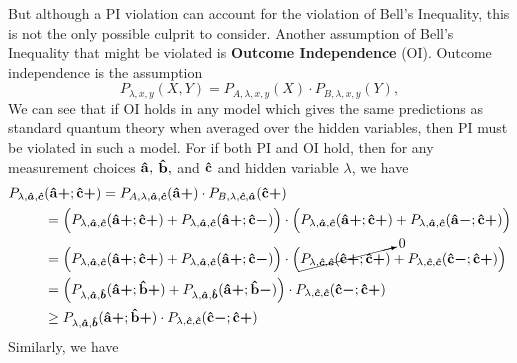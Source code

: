But although a PI violation can account for the violation of Bell's Inequality, this is not the only possible culprit to consider. Another assumption of Bell's Inequality that might be violated is \textbf{Outcome Independence} (OI). Outcome independence is the assumption
\begin{equation}\label{OI}
P_{\lambda,x,y}(X,Y)=P_{A,\lambda,x,y}(X)\cdot P_{B,\lambda,x,y}(Y),
\end{equation}
We can see that if OI holds in any model which gives the same predictions as standard quantum theory when averaged over the hidden variables, then PI must be violated in such a model. For if both PI and OI hold, then for any measurement choices $\vb{\hat{a}},$ $\vb{\hat{b}},$ and $\vb{\hat{c}}$ and hidden variable $\lambda$, we have
\begin{equation}\label{OIPI1}
\begin{split}
 P_{\lambda,\bm{\hat{a}},\bm{\hat{c}}}&(\vb{\hat{{a}}}\bm{+};\vb{\hat{{c}}}\bm{+})=P_{A,\lambda,\bm{\hat{a}},\bm{\hat{c}}}(\vb{\hat{{a}}}\bm{+})\cdot P_{B,\lambda,\bm{\hat{c}},\bm{\hat{a}}}(\vb{\hat{{c}}}\bm{+})\\
 &= \Big( P_{\lambda,\bm{\hat{a}},\bm{\hat{c}}}(\vb{\hat{{a}}}\bm{+};\vb{\hat{{c}}}\bm{+})+ P_{\lambda,\bm{\hat{a}},\bm{\hat{c}}}(\vb{\hat{{a}}}\bm{+};\vb{\hat{{c}}}\bm{-})\Big)\cdot\Big( P_{\lambda,\bm{\hat{a}},\bm{\hat{c}}}(\vb{\hat{{a}}}\bm{+};\vb{\hat{{c}}}\bm{+})+ P_{\lambda,\bm{\hat{a}},\bm{\hat{c}}}(\vb{\hat{{a}}}\bm{-};\vb{\hat{{c}}}\bm{+})\Big)\\
 &= \Big( P_{\lambda,\bm{\hat{a}},\bm{\hat{c}}}(\vb{\hat{{a}}}\bm{+};\vb{\hat{{c}}}\bm{+})+ P_{\lambda,\bm{\hat{a}},\bm{\hat{c}}}(\vb{\hat{{a}}}\bm{+};\vb{\hat{{c}}}\bm{-})\Big)\cdot\Big( \cancelto{0}{P_{\lambda,\bm{\hat{c}},\bm{\hat{c}}}(\vb{\hat{{c}}}\bm{+};\vb{\hat{{c}}}\bm{+})}+ P_{\lambda,\bm{\hat{c}},\bm{\hat{c}}}(\vb{\hat{{c}}}\bm{-};\vb{\hat{{c}}}\bm{+})\Big)\\
 &=\Big( P_{\lambda,\bm{\hat{a}},\bm{\hat{b}}}(\vb{\hat{{a}}}\bm{+};\vb{\hat{{b}}}\bm{+})+ P_{\lambda,\bm{\hat{a}},\bm{\hat{b}}}(\vb{\hat{{a}}}\bm{+};\vb{\hat{{b}}}\bm{-})\Big)\cdot P_{\lambda,\bm{\hat{c}},\bm{\hat{c}}}(\vb{\hat{{c}}}\bm{-};\vb{\hat{{c}}}\bm{+})\\
 &\geq P_{\lambda,\bm{\hat{a}},\bm{\hat{b}}}(\vb{\hat{{a}}}\bm{+};\vb{\hat{{b}}}\bm{+})\cdot P_{\lambda,\bm{\hat{c}},\bm{\hat{c}}}(\vb{\hat{{c}}}\bm{-};\vb{\hat{{c}}}\bm{+}) 
\end{split}
\end{equation}
Similarly, we have
